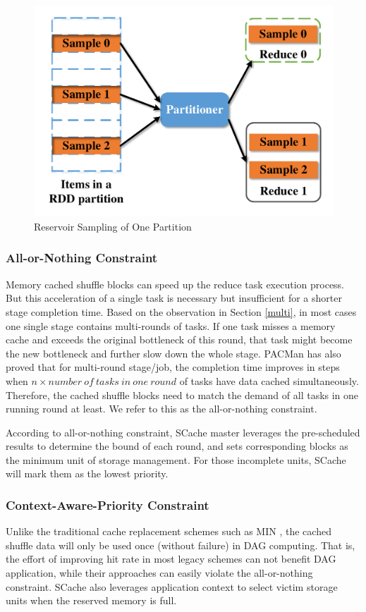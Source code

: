 \begin{figure}
	\centering
	\includegraphics[width=0.6\linewidth]{fig/sample}
	\caption{Reservoir Sampling of One Partition}
	\label{fig:sample}
	\vspace{-1em}
\end{figure}

\subsubsection{All-or-Nothing Constraint}
Memory cached shuffle blocks can speed up the reduce task execution process. But this acceleration of a single task is necessary but insufficient for a shorter stage completion time. Based on the observation in Section \ref{multi}, in most cases one single stage contains multi-rounds of tasks. If one task misses a memory cache and exceeds the original bottleneck of this round, that task might become the new bottleneck and further slow down the whole stage. PACMan \cite{pacman} has also proved that for multi-round stage/job, the completion time improves in steps when $n\times number\ of\ tasks\ in\ one\ round$ of tasks have data cached simultaneously. Therefore, the cached shuffle blocks need to match the demand of all tasks in one running round at least. We refer to this as the all-or-nothing constraint.

According to all-or-nothing constraint, SCache master leverages the pre-scheduled results to determine the bound of each round, and sets corresponding blocks as the minimum unit of storage management.
For those incomplete units, SCache will mark them as the lowest priority.

\subsubsection{Context-Aware-Priority Constraint}
Unlike the traditional cache replacement schemes such as MIN \cite{min}, the cached shuffle data will only be used once (without failure) in DAG computing. That is, the effort of improving hit rate in most legacy schemes can not benefit DAG application, while their approaches can easily violate the all-or-nothing constraint.
SCache also leverages application context to select victim storage units when the reserved memory is full.

